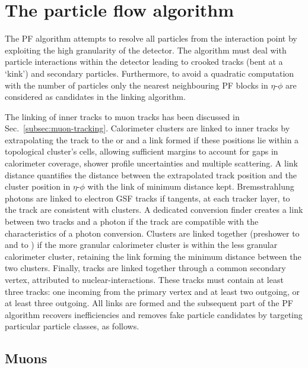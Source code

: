 \section{The particle flow algorithm}

The PF algorithm attempts to resolve all particles from the interaction point
by exploiting the high granularity of the \CMS detector. The algorithm must
deal with particle interactions within the detector leading to crooked tracks
(bent at a `kink') and secondary particles. Furthermore, to avoid a quadratic
computation with the number of particles only the nearest neighbouring PF
blocks in $\eta$-$\phi$ are considered as candidates in the linking algorithm.

The linking of inner tracks to muon tracks has been discussed in
{Sec.~\ref{subsec:muon-tracking}}. Calorimeter clusters are linked to inner
tracks by extrapolating the track to the \ECAL or \HCAL and a link formed if
these positions lie within a topological cluster's cells, allowing sufficient
margins to account for gaps in calorimeter coverage, shower profile
uncertainties and multiple scattering. A link distance quantifies the distance
between the extrapolated track position and the cluster position in
$\eta$-$\phi$ with the link of minimum distance kept. Bremsstrahlung photons
are linked to electron GSF tracks if tangents, at each tracker layer, to the
track are consistent with \ECAL clusters. A dedicated conversion finder
creates a link between two tracks and a photon if the track are compatible
with the characteristics of a photon conversion. Clusters are linked together
(preshower to \ECAL and \ECAL to \HCAL) if the more granular calorimeter
cluster is within the less granular calorimeter cluster, retaining the link
forming the minimum distance between the two clusters. Finally, tracks are
linked together through a common secondary vertex, attributed to
nuclear-interactions. These tracks must contain at least three tracks: one
incoming from the primary vertex and at least two outgoing, or at least three
outgoing. All links are formed and the subsequent part of the PF algorithm
recovers inefficiencies and removes fake particle candidates by targeting
particular particle classes, as follows.

    
\subsection{Muons}

